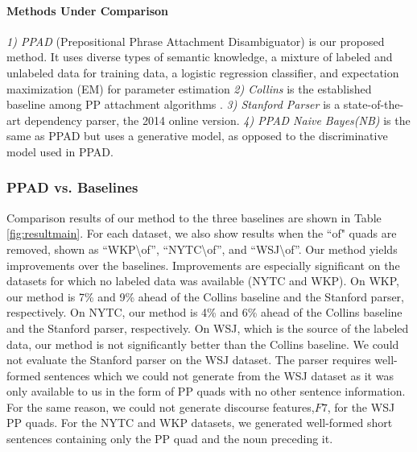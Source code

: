  \paragraph{Methods Under Comparison} 
\textit{1) PPAD}  (Prepositional Phrase Attachment Disambiguator) is  our proposed method. It uses diverse types of semantic knowledge, a mixture of labeled and unlabeled data for training data, a logistic regression classifier, and expectation maximization (EM) for parameter estimation \textit{2) Collins} is the established baseline among PP attachment algorithms \cite{Collins95}.  \textit{3) Stanford Parser} is a state-of-the-art dependency parser, the 2014 online version. \textit{4) PPAD Naive Bayes(NB)}  is the same as PPAD but  uses a generative model,  as opposed to the discriminative model used in  PPAD.


 \subsubsection{PPAD vs. Baselines}
Comparison results of our method to the three baselines are shown in Table \ref{fig:resultmain}. For each dataset, we also show  results when the ``of" quads are removed, shown as ``WKP\textbackslash of'', ``NYTC\textbackslash of'', and ``WSJ\textbackslash of''.
 Our method yields  improvements over the baselines. Improvements are  especially significant on the datasets for which no labeled data was available  (NYTC and WKP). On  WKP, our method is 7\% and 9\% ahead of the Collins baseline and the Stanford parser, respectively.  On  NYTC, our method is 4\% and 6\% ahead of the Collins baseline and the Stanford parser, respectively. On WSJ, which is the source of the labeled data, our method  is not significantly  better than the Collins baseline. We could not evaluate the Stanford parser on the  WSJ dataset.  The parser requires well-formed sentences which we could not generate from the WSJ dataset as it was only available to us in the form of  PP quads with no other sentence information.  For the same reason,  we could not generate discourse features,$F7$, for the  WSJ PP quads.  For the  NYTC and WKP datasets, we generated well-formed short  sentences containing only the PP quad and the noun preceding it.  

 
